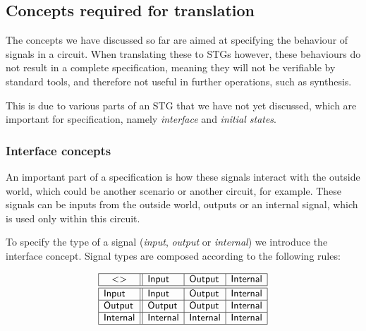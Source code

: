 \documentclass[british,conference,compsoc]{IEEEtran}
\begin{document}
\subsection{Concepts required for translation\label{sub:trans-concepts}}

\vspace{-2mm}

The concepts we have discussed so far are aimed at specifying the behaviour of 
signals in a circuit. When translating these to STGs however, these behaviours 
do not result in a complete specification, meaning they will not be 
verifiable by standard tools, and therefore not useful in further operations, 
such as synthesis.

This is due to various parts of an STG that we have not yet discussed, which 
are important for specification, namely \emph{interface} and 
\emph{initial states}.

\vspace{-3mm}

\subsubsection{Interface concepts\label{sub:interface}} 

An important part of a specification is how these signals interact with the 
outside world, which could be another scenario or another circuit, for example.
These signals can be inputs from the outside world, outputs or an internal 
signal, which is used only within this circuit. 

To specify the type of a signal (\emph{input},
\emph{output} or \emph{internal}) we introduce the \textsf{interface} concept.
Signal types are composed according to the following rules:

\vspace{-2mm}

\[
\begin{array}{|l||l|l|l|}
\hline
\multicolumn{1}{|c||}{<>} & \mathsf{Input} & \mathsf{Output} &
\mathsf{Internal} \\ \hline \hline
\mathsf{Input} & \mathsf{Input} & \mathsf{Output} & \mathsf{Internal} \\ \hline
\mathsf{Output} & \mathsf{Output} & \mathsf{Output} & \mathsf{Internal} \\
\hline
\mathsf{Internal}& \mathsf{Internal} & \mathsf{Internal} & \mathsf{Internal} \\
\hline
\end{array}
\]
\end{document}
